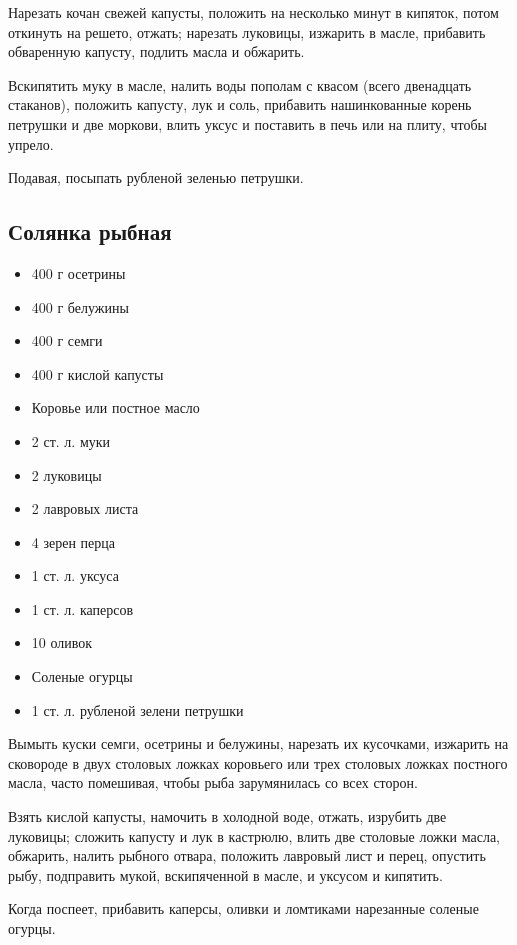 Нарезать кочан свежей капусты, положить на несколько минут в кипяток, потом откинуть на решето, отжать; нарезать луковицы, изжарить в масле, прибавить обваренную капусту, подлить масла и обжарить.

Вскипятить муку в масле, налить воды пополам с квасом (всего двенадцать стаканов), положить капусту, лук и соль, прибавить нашинкованные корень петрушки и две моркови, влить уксус и поставить в печь или на плиту, чтобы упрело.

Подавая, посыпать рубленой зеленью петрушки.

\subsection{Солянка рыбная}\label{11solianka-ryb}

\begin{itemize}
	\item 400 г осетрины
    \item 400 г белужины
    \item 400 г семги
    \item 400 г кислой капусты
    \item Коровье или постное масло
    \item 2 ст. л. муки 
    \item 2 луковицы 
    \item 2 лавровых листа
    \item 4 зерен перца 
    \item 1 ст. л. уксуса 
    \item 1 ст. л. каперсов
    \item 10 оливок 
    \item Соленые огурцы
    \item 1 ст. л. рубленой зелени петрушки
\end{itemize}

Вымыть куски семги, осетрины и белужины, нарезать их кусочками, изжарить на сковороде в двух столовых ложках коровьего или трех столовых ложках постного масла, часто помешивая, чтобы рыба зарумянилась со всех сторон.

Взять кислой капусты, намочить в холодной воде, отжать, изрубить две луковицы; сложить капусту и лук в кастрюлю, влить две столовые ложки масла, обжарить, налить рыбного отвара, положить лавровый лист и перец, опустить рыбу, подправить мукой, вскипяченной в масле, и уксусом и кипятить.

Когда поспеет, прибавить каперсы, оливки и ломтиками нарезанные соленые огурцы.

